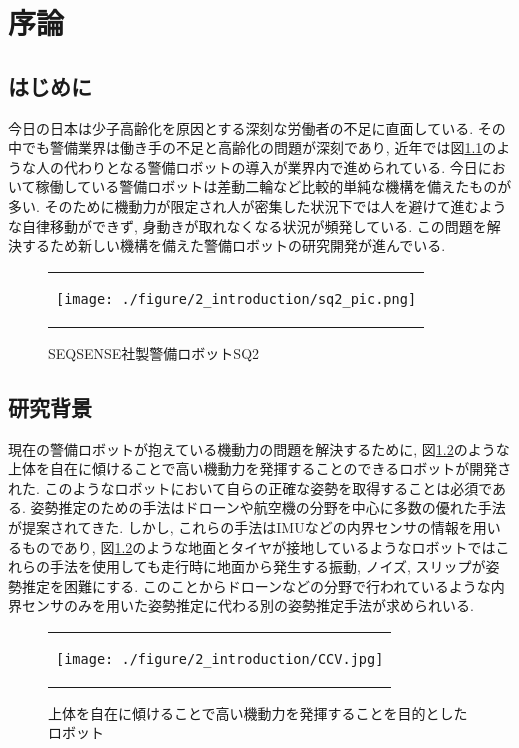 \chapter{序論}
\section{はじめに}
今日の日本は少子高齢化を原因とする深刻な労働者の不足に直面している. その中でも警備業界は働き手の不足と高齢化の問題が深刻であり, 近年では図\ref{fig:SQ2_pic}のような人の代わりとなる警備ロボットの導入が業界内で進められている. 今日において稼働している警備ロボットは差動二輪など比較的単純な機構を備えたものが多い. そのために機動力が限定され人が密集した状況下では人を避けて進むような自律移動ができず, 身動きが取れなくなる状況が頻発している. この問題を解決するため新しい機構を備えた警備ロボットの研究開発が進んでいる.

\begin{figure}[thpb]
  \begin{tabular}{c}
  \begin{minipage}[htpb]{1.0\hsize}
  \begin{center}
  \texttt{[image: ./figure/2\_introduction/sq2\_pic.png]}
  \caption{SEQSENSE社製警備ロボットSQ2}
  \label{fig:SQ2_pic}
  \end{center}
  \end{minipage}
  \end{tabular}
\end{figure}

\newpage

\section{研究背景}\label{sec:background}
現在の警備ロボットが抱えている機動力の問題を解決するために, 図\ref{fig:CCV_pic}のような上体を自在に傾けることで高い機動力を発揮することのできるロボットが開発された. このようなロボットにおいて自らの正確な姿勢を取得することは必須である. 姿勢推定のための手法はドローンや航空機の分野を中心に多数の優れた手法が提案されてきた. しかし, これらの手法はIMUなどの内界センサの情報を用いるものであり, 図\ref{fig:CCV_pic}のような地面とタイヤが接地しているようなロボットではこれらの手法を使用しても走行時に地面から発生する振動, ノイズ, スリップが姿勢推定を困難にする\cite{Vaganay1993MobileRA}. このことからドローンなどの分野で行われているような内界センサのみを用いた姿勢推定に代わる別の姿勢推定手法が求められいる. \par

\begin{figure}[thpb]
  \begin{tabular}{c}
  \begin{minipage}[htpb]{1.0\hsize}
  \begin{center}
  \texttt{[image: ./figure/2\_introduction/CCV.jpg]}
  \caption{上体を自在に傾けることで高い機動力を発揮することを目的としたロボット}
  \label{fig:CCV_pic}
  \end{center}
  \end{minipage}
  \end{tabular}
\end{figure}

